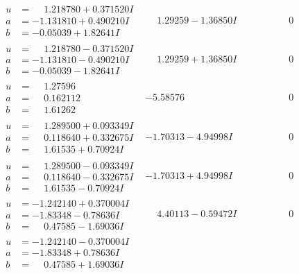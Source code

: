 \documentclass[1p]{elsarticle_modified}
\theoremstyle{definition}
\begin{document}
$$\begin{array}{c|c|c}
\begin{aligned}
u &= \phantom{-}1.218780 + 0.371520 I \\
a &= -1.131810 + 0.490210 I \\
b &= -0.05039 + 1.82641 I\end{aligned}
 & \phantom{-}1.29259 - 1.36850 I & \phantom{-0.000000 } 0 \\ \hline\begin{aligned}
u &= \phantom{-}1.218780 - 0.371520 I \\
a &= -1.131810 - 0.490210 I \\
b &= -0.05039 - 1.82641 I\end{aligned}
 & \phantom{-}1.29259 + 1.36850 I & \phantom{-0.000000 } 0 \\ \hline\begin{aligned}
u &= \phantom{-}1.27596\phantom{ +0.000000I} \\
a &= \phantom{-}0.162112\phantom{ +0.000000I} \\
b &= \phantom{-}1.61262\phantom{ +0.000000I}\end{aligned}
 & -5.58576\phantom{ +0.000000I} & \phantom{-0.000000 } 0 \\ \hline\begin{aligned}
u &= \phantom{-}1.289500 + 0.093349 I \\
a &= \phantom{-}0.118640 + 0.332675 I \\
b &= \phantom{-}1.61535 + 0.70924 I\end{aligned}
 & -1.70313 - 4.94998 I & \phantom{-0.000000 } 0 \\ \hline\begin{aligned}
u &= \phantom{-}1.289500 - 0.093349 I \\
a &= \phantom{-}0.118640 - 0.332675 I \\
b &= \phantom{-}1.61535 - 0.70924 I\end{aligned}
 & -1.70313 + 4.94998 I & \phantom{-0.000000 } 0 \\ \hline\begin{aligned}
u &= -1.242140 + 0.370004 I \\
a &= -1.83348 - 0.78636 I \\
b &= \phantom{-}0.47585 - 1.69036 I\end{aligned}
 & \phantom{-}4.40113 - 0.59472 I & \phantom{-0.000000 } 0 \\ \hline\begin{aligned}
u &= -1.242140 - 0.370004 I \\
a &= -1.83348 + 0.78636 I \\
b &= \phantom{-}0.47585 + 1.69036 I\end{aligned}

\end{array}$$
\end{document}
